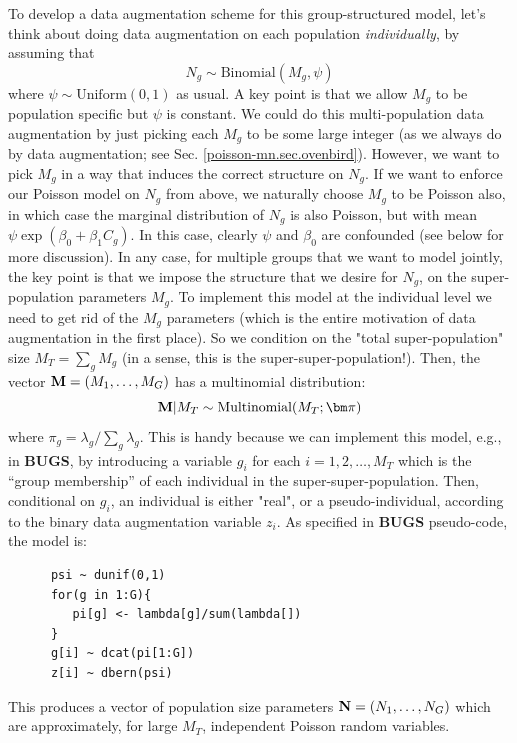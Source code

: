 To develop a data augmentation scheme for this group-structured model,
let's think about doing data augmentation on each population {\it
  individually}, by assuming that
\[
 N_{g} \sim \mbox{Binomial}(M_{g} , \psi)
\]
where $\psi \sim \mbox{Uniform}(0,1)$ as usual.  A key point is that
we allow $M_{g}$ to be population specific but $\psi$ is constant.  We
could do this multi-population data augmentation by just picking each
$M_{g}$ to be some large integer (as we always do by data
augmentation; see Sec. \ref{poisson-mn.sec.ovenbird}). However, we
want to pick $M_{g}$ in a way that induces
the correct structure on
$N_{g}$. If we want to enforce our Poisson model on $N_{g}$ from
above, we naturally choose $M_{g}$ to be Poisson also, in which case
the marginal distribution of $N_{g}$ is also Poisson, but with mean
$\psi \exp(\beta_{0} + \beta_{1}C_{g})$.  In this case, clearly $\psi$ and
$\beta_{0}$ are confounded (see below for more discussion).
In any case, for multiple groups that we want to model jointly, the
key point is that we
 impose the structure that we desire for $N_{g}$, on the
super-population parameters $M_{g}$.  To implement this model at the
individual level we need to get rid of the $M_{g}$ parameters (which
is the entire motivation of data augmentation in the first place). So
we condition on the "total super-population" size $M_{T}= \sum_{g}
M_{g}$ (in a sense, this is the super-super-population!). Then, the vector ${\bf M} = (M_{1},\ldots,M_{G})$ has a
multinomial distribution:
\begin{equation}
{\bf M}|M_{T} \sim \mbox{Multinomial}(M_{T};  {\bm \pi} )
\label{eq.mn1}
\end{equation}
where
$\pi_{g} = \lambda_{g}/\sum_{g} \lambda_{g}$.  This is handy because
we can implement this model, e.g., in {\bf BUGS}, by introducing a
variable $g_{i}$ for each $i=1,2,\ldots, M_{T}$ which is the ``group
membership'' of each individual in the super-super-population.  Then,
conditional on $g_{i}$, an individual is either "real", or a
pseudo-individual, according to the binary data augmentation variable
$z_{i}$.  As specified in {\bf BUGS} pseudo-code, the
model is:
\begin{verbatim}
      psi ~ dunif(0,1)
      for(g in 1:G){
         pi[g] <- lambda[g]/sum(lambda[])
      }
      g[i] ~ dcat(pi[1:G])
      z[i] ~ dbern(psi)
\end{verbatim}
This produces a vector of population size parameters ${\bf N} =
(N_{1},\ldots,N_{G})$ which are approximately, for large $M_{T}$,
independent Poisson random variables.

